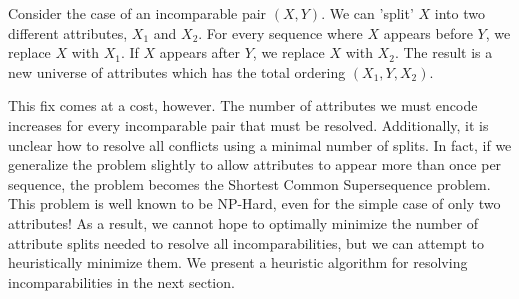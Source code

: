 Consider the case of an incomparable pair $(X,Y)$. We can 'split' $X$ into two different attributes, $X_1$ and $X_2$. For every sequence where $X$ appears before $Y$, we replace $X$ with $X_1$. If $X$ appears after $Y$, we replace $X$ with $X_2$. The result is a new universe of attributes which has the total ordering $(X_1, Y, X_2)$. 

This fix comes at a cost, however. The number of attributes we must encode increases for every incomparable pair that must be resolved. Additionally, it is unclear how to resolve all conflicts using a minimal number of splits. In fact, if we generalize the problem slightly to allow attributes to appear more than once per sequence, the problem becomes the Shortest Common Supersequence problem. This problem is well known to be NP-Hard, even for the simple case of only two attributes! As a result, we cannot hope to optimally minimize the number of attribute splits needed to resolve all incomparabilities, but we can attempt to heuristically minimize them. We present a heuristic algorithm for resolving incomparabilities in the next section.